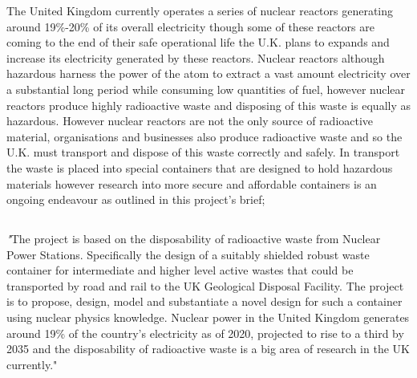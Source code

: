 The United Kingdom currently operates a series of nuclear reactors generating around 19\%-20\% of its overall electricity \cite{Percentage} though some of these reactors are coming to the end of their safe operational life the U.K. plans to expands and increase its electricity generated by these reactors. Nuclear reactors although hazardous harness the power of the atom to extract a vast amount electricity over a substantial long period while consuming low quantities of fuel, however nuclear reactors produce highly radioactive waste and disposing of this waste is equally as hazardous. However nuclear reactors are not the only source of radioactive material, organisations and businesses also produce radioactive waste and so the U.K. must transport and dispose of this waste correctly and safely. In transport the waste is placed into special containers that are designed to hold hazardous materials however research into more secure and affordable containers is an ongoing endeavour as outlined in this project's brief; \\

\vspace{-1.2cm}
\subsection*{ }
\label{Project Brief SubSection}
\begin{minipage}{1\textwidth}
\begin{center} \emph
"The project is based on the disposability of radioactive waste from Nuclear Power Stations. Specifically the design of a suitably shielded robust waste container for intermediate and higher level active wastes that could be transported by road and rail to the UK Geological Disposal Facility. The project is to propose, design, model and substantiate a novel design for such a container using nuclear physics knowledge. Nuclear power in the United Kingdom generates around 19\% of the country’s electricity as of 2020, projected to rise to a third by 2035 and the disposability of radioactive waste is a big area of research in the UK currently." \cite{MiniProjectOptions} 
\end{center}
\end{minipage}
\vspace{0.5cm}

